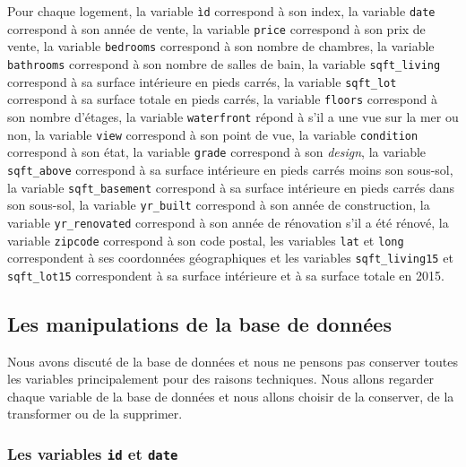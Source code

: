 \documentclass[
  11pt,
  french,
]{article}
\begin{document}
Pour chaque logement, la variable \texttt{ìd} correspond à son index, la
variable \texttt{date} correspond à son année de vente, la variable
\texttt{price} correspond à son prix de vente, la variable
\texttt{bedrooms} correspond à son nombre de chambres, la variable
\texttt{bathrooms} correspond à son nombre de salles de bain, la
variable \texttt{sqft\_living} correspond à sa surface intérieure en
pieds carrés, la variable \texttt{sqft\_lot} correspond à sa surface
totale en pieds carrés, la variable \texttt{floors} correspond à son
nombre d'étages, la variable \texttt{waterfront} répond à s'il a une vue
sur la mer ou non, la variable \texttt{view} correspond à son point de
vue, la variable \texttt{condition} correspond à son état, la variable
\texttt{grade} correspond à son \textit{design}, la variable
\texttt{sqft\_above} correspond à sa surface intérieure en pieds carrés
moins son sous-sol, la variable \texttt{sqft\_basement} correspond à sa
surface intérieure en pieds carrés dans son sous-sol, la variable
\texttt{yr\_built} correspond à son année de construction, la variable
\texttt{yr\_renovated} correspond à son année de rénovation s'il a été
rénové, la variable \texttt{zipcode} correspond à son code postal, les
variables \texttt{lat} et \texttt{long} correspondent à ses coordonnées
géographiques et les variables \texttt{sqft\_living15} et
\texttt{sqft\_lot15} correspondent à sa surface intérieure et à sa
surface totale en 2015.

\newpage

\hypertarget{les-manipulations-de-la-base-de-donnuxe9es}{%
\subsection{Les manipulations de la base de
données}\label{les-manipulations-de-la-base-de-donnuxe9es}}

Nous avons discuté de la base de données et nous ne pensons pas
conserver toutes les variables principalement pour des raisons
techniques. Nous allons regarder chaque variable de la base de données
et nous allons choisir de la conserver, de la transformer ou de la
supprimer.

\hypertarget{les-variables-id-et-date}{%
\subsubsection{\texorpdfstring{Les variables \texttt{id} et
\texttt{date}}{Les variables id et date}}\label{les-variables-id-et-date}}
\end{document}
